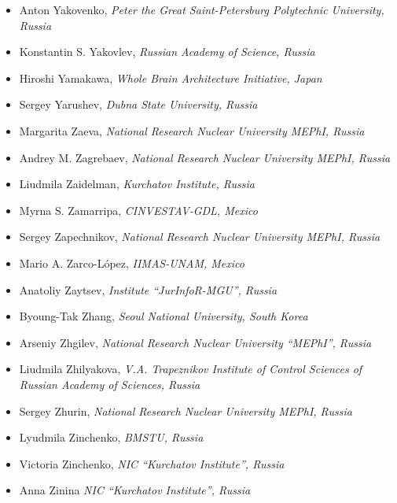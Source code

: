 \documentclass[10pt,fleqn,openany]{book} %
\begin{document}
\begin{itemize}
		\item Anton Yakovenko, \textit{Peter the Great Saint-Petersburg Polytechnic University, Russia}
		\item Konstantin S. Yakovlev, \textit{Russian Academy of Science, Russia}
		\item Hiroshi Yamakawa, \textit{Whole Brain Architecture Initiative, Japan}
		\item Sergey Yarushev, \textit{Dubna State University, Russia}
		\item Margarita Zaeva, \textit{National Research Nuclear University MEPhI, Russia}
		\item Andrey M. Zagrebaev, \textit{National Research Nuclear University MEPhI, Russia}
		\item Liudmila Zaidelman, \textit{Kurchatov Institute, Russia}
		\item Myrna S. Zamarripa, \textit{CINVESTAV-GDL, Mexico}
		\item Sergey Zapechnikov, \textit{National Research Nuclear University MEPhI, Russia}
		\item Mario A. Zarco-López, \textit{IIMAS-UNAM, Mexico}
		\item Anatoliy Zaytsev, \textit{Institute ``JurInfoR-MGU'', Russia}
		\item Byoung-Tak Zhang, \textit{Seoul National University, South Korea}
		\item Arseniy Zhgilev, \textit{National Research Nuclear University ``MEPhI'', Russia}
		\item Liudmila Zhilyakova, \textit{V.A. Trapeznikov Institute of Control Sciences of Russian Academy of Sciences, Russia}
		\item Sergey Zhurin, \textit{National Research Nuclear University MEPhI, Russia}
		\item Lyudmila Zinchenko, \textit{BMSTU, Russia}
		\item Victoria Zinchenko, \textit{NIC ``Kurchatov Institute'', Russia}
		\item Anna Zinina \textit{NIC ``Kurchatov Institute'', Russia}
	\end{itemize}

\newpage

\pagestyle{fancy}
\pagestyle{empty}
\end{document}
